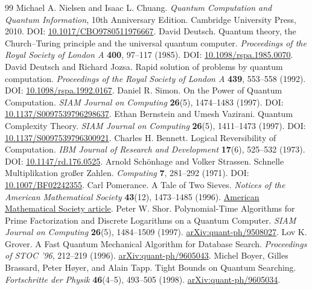 \documentclass[11pt,oneside,openany]{book}
\theoremstyle{definition}
\begin{document}
\backmatter
\begin{thebibliography}{99}
 Michael A. Nielsen and Isaac L. Chuang.
\emph{Quantum Computation and Quantum Information}, 10th Anniversary Edition.
Cambridge University Press, 2010.
DOI: \href{https://doi.org/10.1017/CBO9780511976667}{10.1017/CBO9780511976667}.
 David Deutsch.
Quantum theory, the Church--Turing principle and the universal quantum computer.
\emph{Proceedings of the Royal Society of London A} \textbf{400}, 97--117 (1985).
DOI: \href{https://doi.org/10.1098/rspa.1985.0070}{10.1098/rspa.1985.0070}.
 David Deutsch and Richard Jozsa.
Rapid solution of problems by quantum computation.
\emph{Proceedings of the Royal Society of London A} \textbf{439}, 553--558 (1992).
DOI: \href{https://doi.org/10.1098/rspa.1992.0167}{10.1098/rspa.1992.0167}.
 Daniel R. Simon.
On the Power of Quantum Computation.
\emph{SIAM Journal on Computing} \textbf{26}(5), 1474--1483 (1997).
DOI: \href{https://doi.org/10.1137/S0097539796298637}{10.1137/S0097539796298637}.
 Ethan Bernstein and Umesh Vazirani.
Quantum Complexity Theory.
\emph{SIAM Journal on Computing} \textbf{26}(5), 1411--1473 (1997).
DOI: \href{https://doi.org/10.1137/S0097539796300921}{10.1137/S0097539796300921}.
 Charles H. Bennett.
Logical Reversibility of Computation.
\emph{IBM Journal of Research and Development} \textbf{17}(6), 525--532 (1973).
DOI: \href{https://doi.org/10.1147/rd.176.0525}{10.1147/rd.176.0525}.
 Arnold Sch\"onhage and Volker Strassen.
Schnelle Multiplikation gro\ss er Zahlen.
\emph{Computing} \textbf{7}, 281--292 (1971).
DOI: \href{https://doi.org/10.1007/BF02242355}{10.1007/BF02242355}.
 Carl Pomerance.
A Tale of Two Sieves.
\emph{Notices of the American Mathematical Society} \textbf{43}(12), 1473--1485 (1996).
\href{https://www.ams.org/notices/199612/pomerance.pdf}{American Mathematical Society article}.
 Peter W. Shor.
Polynomial-Time Algorithms for Prime Factorization and Discrete Logarithms on a Quantum Computer.
\emph{SIAM Journal on Computing} \textbf{26}(5), 1484--1509 (1997).
\href{https://arxiv.org/abs/quant-ph/9508027}{arXiv:quant-ph/9508027}.
 Lov K. Grover.
A Fast Quantum Mechanical Algorithm for Database Search.
\emph{Proceedings of STOC '96}, 212--219 (1996).
\href{https://arxiv.org/abs/quant-ph/9605043}{arXiv:quant-ph/9605043}.
 Michel Boyer, Gilles Brassard, Peter H\o yer, and Alain Tapp.
Tight Bounds on Quantum Searching.
\emph{Fortschritte der Physik} \textbf{46}(4--5), 493--505 (1998).
\href{https://arxiv.org/abs/quant-ph/9605034}{arXiv:quant-ph/9605034}.
\end{thebibliography}
\end{document}
